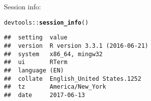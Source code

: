 \documentclass{article}\usepackage[]{graphicx}\usepackage[]{color}
\makeatletter
\newcommand{\hlopt}[1]{\textcolor[rgb]{0,0,0}{#1}}%
\newcommand{\hlstd}[1]{\textcolor[rgb]{0.345,0.345,0.345}{#1}}%
\newcommand{\hlkwd}[1]{\textcolor[rgb]{0.737,0.353,0.396}{\textbf{#1}}}%
\newenvironment{kframe}{%
 \def\at@end@of@kframe{}%
 \ifinner\ifhmode%
  \def\at@end@of@kframe{\end{minipage}}%
  \begin{minipage}{\columnwidth}%
 \fi\fi%
 \def\FrameCommand##1{\hskip\@totalleftmargin \hskip-\fboxsep
 \colorbox{shadecolor}{##1}\hskip-\fboxsep
     \hskip-\linewidth \hskip-\@totalleftmargin \hskip\columnwidth}%
 \MakeFramed {\advance\hsize-\width
   \@totalleftmargin\z@ \linewidth\hsize
   \@setminipage}}%
 {\par\unskip\endMakeFramed%
 \at@end@of@kframe}
\newenvironment{knitrout}{}{} %
\makeatother
\begin{document}
Session info:
\begin{knitrout}
\color{fgcolor}\begin{kframe}
\begin{alltt}
\hlstd{devtools}\hlopt{::}\hlkwd{session_info}\hlstd{()}
\end{alltt}


{\ttfamily\noindent\itshape\color{messagecolor}{\#\# Session info -----------------------------------------------}}\begin{verbatim}
##  setting  value                       
##  version  R version 3.3.1 (2016-06-21)
##  system   x86_64, mingw32             
##  ui       RTerm                       
##  language (EN)                        
##  collate  English_United States.1252  
##  tz       America/New_York            
##  date     2017-06-13
\end{verbatim}



\end{kframe}
\end{knitrout}
\end{document}
